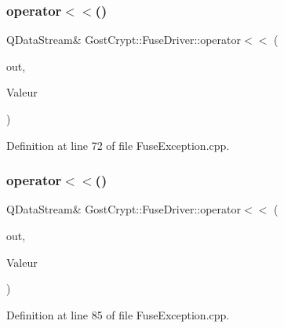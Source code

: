 \subsubsection{\texorpdfstring{operator$<$$<$()}{operator<<()}\hspace{0.1cm}{\footnotesize\ttfamily [5/6]}}
{\footnotesize\ttfamily Q\+Data\+Stream\& Gost\+Crypt\+::\+Fuse\+Driver\+::operator$<$$<$ (\begin{DoxyParamCaption}\item[{Q\+Data\+Stream \&}]{out,  }\item[{const \hyperlink{class_gost_crypt_1_1_fuse_driver_1_1_volume_not_opened_yet}{Gost\+Crypt\+::\+Fuse\+Driver\+::\+Volume\+Not\+Opened\+Yet} \&}]{Valeur }\end{DoxyParamCaption})}



Definition at line 72 of file Fuse\+Exception.\+cpp.

\mbox{\label{namespace_gost_crypt_1_1_fuse_driver_aab7325e2ce94279830b293a769040b40}} 
\subsubsection{\texorpdfstring{operator$<$$<$()}{operator<<()}\hspace{0.1cm}{\footnotesize\ttfamily [6/6]}}
{\footnotesize\ttfamily Q\+Data\+Stream\& Gost\+Crypt\+::\+Fuse\+Driver\+::operator$<$$<$ (\begin{DoxyParamCaption}\item[{Q\+Data\+Stream \&}]{out,  }\item[{const \hyperlink{class_gost_crypt_1_1_fuse_driver_1_1_failed_create_fuse_mount_point}{Gost\+Crypt\+::\+Fuse\+Driver\+::\+Failed\+Create\+Fuse\+Mount\+Point} \&}]{Valeur }\end{DoxyParamCaption})}



Definition at line 85 of file Fuse\+Exception.\+cpp.

\mbox{\label{namespace_gost_crypt_1_1_fuse_driver_a53c7bfa9102b2d0f8597432d302cee23}} 
